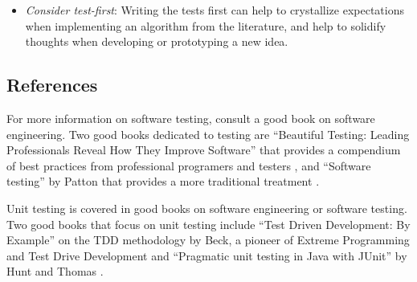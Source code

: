 \begin{itemize}
	\item \emph{Consider test-first}: Writing the tests first can help to crystallize expectations when implementing an algorithm from the literature, and help to solidify thoughts when developing or prototyping a new idea.
\end{itemize}

% 
% 
\subsection{References}
For more information on software testing, consult a good book on software engineering. Two good books dedicated to testing are ``Beautiful Testing: Leading Professionals Reveal How They Improve Software'' that provides a compendium of best practices from professional programers and testers \cite{Goucher2009}, and ``Software testing'' by Patton that provides a more traditional treatment \cite{Patton2005}.

Unit testing is covered in good books on software engineering or software testing.
Two good books that focus on unit testing include ``Test Driven Development: By Example'' on the TDD methodology by Beck, a pioneer of Extreme Programming and Test Drive Development \cite{Beck2002} and ``Pragmatic unit testing in Java with JUnit'' by Hunt and Thomas \cite{Hunt2003}.

